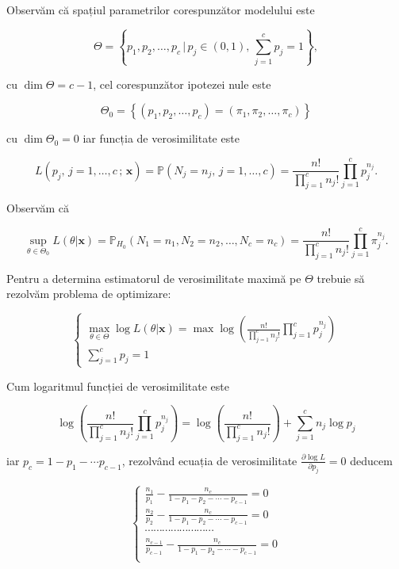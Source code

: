 \documentclass[]{article}
\begin{document}
Observăm că spațiul parametrilor corespunzător modelului este

\[
\Theta = \left\{p_1, p_2, \ldots, p_c\,|\,p_{j}\in(0,1),\,\sum_{j = 1}^{c}p_{j} = 1\right\},
\]

cu \(\dim{\Theta} = c-1\), cel corespunzător ipotezei nule este

\[
\Theta_0 = \left\{(p_1,p_2,\ldots, p_c) = (\pi_1,\pi_2,\ldots, \pi_c)\right\}
\]

cu \(\dim{\Theta_0} = 0\) iar funcția de verosimilitate este

\[
  L(p_{j},\,j = 1,\ldots,c\,;\,\mathbf{x}) = \mathbb{P}(N_{j} = n_{j}, \,j = 1,\ldots,c) = \frac{n!}{\prod_{j = 1}^{c} n_{j}!}\prod_{j = 1}^{c} p_{j}^{n_{j}}.
\]

Observăm că

\[
  \sup_{\theta\in\Theta_0}L(\theta|\mathbf{x}) = \mathbb{P}_{H_0}(N_1 = n_1, N_2 = n_2, \ldots, N_c = n_c) = \frac{n!}{\prod_{j = 1}^{c} n_{j}!}\prod_{j = 1}^{c} \pi_{j}^{n_{j}}.
\]

Pentru a determina estimatorul de verosimilitate maximă pe \(\Theta\)
trebuie să rezolvăm problema de optimizare:

\[
  \left\{\begin{array}{ll}
    \max_{\theta\in\Theta} \log L(\theta|\mathbf{x}) = \max \log{\left(\frac{n!}{\prod_{j = 1}^{c} n_{j}!}\prod_{j = 1}^{c} p_{j}^{n_{j}}\right)}\\
    \sum_{j = 1}^{c}p_{j} = 1
  \end{array}\right.
\]

Cum logaritmul funcției de verosimilitate este

\[
\log{\left(\frac{n!}{\prod_{j = 1}^{c} n_{j}!}\prod_{j = 1}^{c} p_{j}^{n_{j}}\right)} = \log\left(\frac{n!}{\prod_{j = 1}^{c} n_{j}!}\right) + \sum_{j = 1}^{c}n_{j}\log{p_j}
\]

iar \(p_c = 1 - p_1 -\cdots p_{c-1}\), rezolvând ecuația de
verosimilitate \(\frac{\partial\log{L}}{\partial p_j} = 0\) deducem

\[
\left\{\begin{array}{llll}
  \frac{n_1}{p_1} - \frac{n_c}{1 - p_1 - p_2 -\cdots -p_{c-1}} = 0\\
  \frac{n_2}{p_2} - \frac{n_c}{1 - p_1 - p_2 -\cdots -p_{c-1}} = 0\\
  \cdots\cdots\cdots\cdots\cdots\cdots\cdots\cdots\\
  \frac{n_{c-1}}{p_{c-1}} - \frac{n_c}{1 - p_1 - p_2 -\cdots -p_{c-1}} = 0\\
\end{array}\right.
\]
\end{document}
